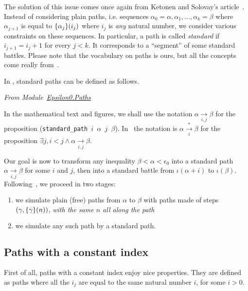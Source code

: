 The solution of this issue comes  once again from Ketonen and Solovay's article~\cite{KS81}. Instead of considering plain paths, i.e. sequences 
$\alpha_0=\alpha,\alpha_1,\dots,\alpha_k=\beta$ where $\alpha_{j+1}$ is equal
to $\mbox{$\{\alpha_j\}(i_j)$}$ where $i_j$ is \emph{any} natural number, 
we consider various constraints on these sequences.
In particular, a path is called \emph{standard} if $i_{j+1} = i_j + 1$ for every $j<k$.
It  corresponds to a ``segment'' of some standard battles. 
Please note that the vocabulary on paths is ours, but all the concepts come really from~\cite{KS81}.

In \coq{}, standard paths can be defined as follows.

\vspace{4pt}

\emph{From
Module~\href{../theories/html/hydras.Epsilon0.Paths.html}{Epsilon0.Paths}}



In the mathematical text and figures, we shall use the notation 
$\alpha \xrightarrow[i,j]{}\beta$ for the proposition 
(\texttt{standard\_path $i$ $\alpha$ $j$ $\beta$}).
In~\cite{KS81} the notation is
$\alpha \xrightarrow[i]{*}\beta$
for 
the proposition  $\exists j, i<j \wedge \alpha \xrightarrow[i,j]{} \beta$.



Our goal is now  to transform any inequality $\beta<\alpha<\epsilon_0$ into a standard path $\alpha \xrightarrow[i,j]{} \beta$ for some $i$ and $j$, then into a standard battle
from $\iota(\alpha+i)$ to $\iota(\beta)$. 
Following~\cite{KS81}, we proceed in two stages:
\begin{enumerate}
\item we simulate plain (free) paths from $\alpha$ to $\beta$ with
paths made of steps $(\gamma,\mbox{$\{\gamma\}(n)$})$, \emph{with the same $n$ all along the path}
\item we simulate any such path by a standard path.
\end{enumerate}



\subsection{Paths with a constant index}

First of all, paths with a constant index 
enjoy nice properties. They are defined as paths where all the $i_j$ are equal to the same natural number $i$, for some $i>0$. 


